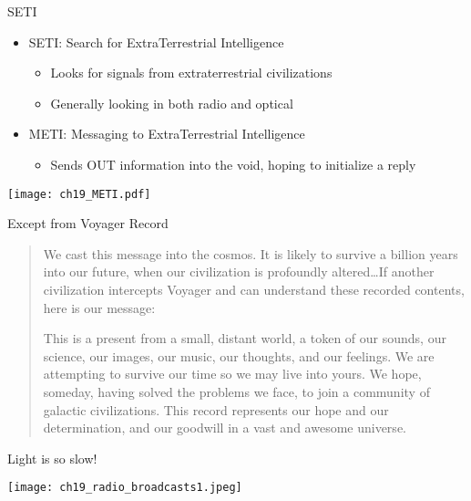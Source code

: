 \documentclass[pdf,aspectratio=169]{beamer}
\begin{document}
\begin{frame}{SETI}
  \begin{itemize}
	\item SETI: \alert{S}earch for \alert{E}xtra\alert{T}errestrial \alert{I}ntelligence
	  \begin{itemize}
		\item Looks for signals from extraterrestrial civilizations
		\item Generally looking in both radio and optical
	  \end{itemize}
	\item METI: \alert{M}essaging to \alert{E}xtra\alert{T}errestrial \alert{I}ntelligence
	  \begin{itemize}
		\item Sends OUT information into the void, hoping to initialize a reply
	  \end{itemize}
  \end{itemize}
  \begin{center}
	\texttt{[image: ch19\_METI.pdf]}
  \end{center}
\end{frame}



\begin{frame}{Except from Voyager Record}
  \begin{quotation}
	We cast this message into the cosmos. It is likely to survive a billion years into our future, when our civilization is profoundly altered\ldots If another civilization intercepts Voyager and can understand these recorded contents, here is our message:

	This is a present from a small, distant world, a token of our sounds, our science, our images, our music, our thoughts, and our feelings. We are attempting to survive our time so we may live into yours. We hope, someday, having solved the problems we face, to join a community of galactic civilizations. This record represents our hope and our determination, and our goodwill in a vast and awesome universe.
  \end{quotation}
\end{frame}


\begin{frame}{Light is so slow!}
  \begin{center}
	\texttt{[image: ch19\_radio\_broadcasts1.jpeg]}
  \end{center}
\end{frame}
\end{document}
